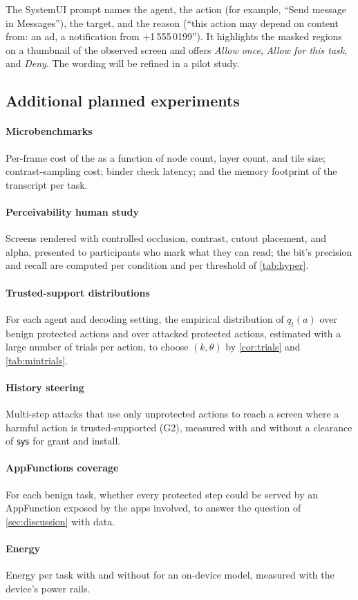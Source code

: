 The SystemUI prompt names the agent, the action (for example, ``Send message in Messages''), the target, and the reason (``this action may depend on content from: an ad, a notification from +1\,555\,0199''). It highlights the masked regions on a thumbnail of the observed screen and offers \emph{Allow once}, \emph{Allow for this task}, and \emph{Deny}. The wording will be refined in a pilot study. 

\subsection{Additional planned experiments}\label{app:more}

\paragraph{Microbenchmarks} Per-frame cost of the \LS{} as a function of node count, layer count, and tile size; contrast-sampling cost; binder check latency; and the memory footprint of the transcript per task.

\paragraph{Perceivability human study} Screens rendered with controlled occlusion, contrast, cutout placement, and alpha, presented to participants who mark what they can read; the bit's precision and recall are computed per condition and per threshold of \cref{tab:hyper}.

\paragraph{Trusted-support distributions} For each agent and decoding setting, the empirical distribution of $q_t(a)$ over benign protected actions and over attacked protected actions, estimated with a large number of trials per action, to choose $(k,\theta)$ by \cref{cor:trials} and \cref{tab:mintrials}.

\paragraph{History steering} Multi-step attacks that use only unprotected actions to reach a screen where a harmful action is trusted-supported (G2), measured with and without a clearance of $\textsf{sys}$ for \textsf{grant} and \textsf{install}.

\paragraph{AppFunctions coverage} For each benign task, whether every protected step could be served by an AppFunction exposed by the apps involved, to answer the question of \cref{sec:discussion} with data.

\paragraph{Energy} Energy per task with and without \PG{} for an on-device model, measured with the device's power rails. 
